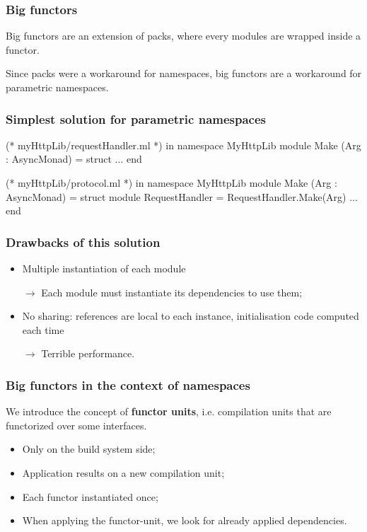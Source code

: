 \documentclass{beamer}
\begin{document}
\begin{frame}
\frametitle{Big functors}

Big functors are an extension of packs, where every modules are wrapped inside a
functor. 

\medskip

Since packs were a workaround for namespaces, big functors are a workaround for
parametric namespaces.

\end{frame}

\begin{frame}[fragile]
  \frametitle{Simplest solution for parametric namespaces}
    \begin{OCaml}
      (* myHttpLib/requestHandler.ml *)
      in namespace MyHttpLib
      module Make (Arg : AsyncMonad) = 
        struct 
          ...
        end
    \end{OCaml}

    \pause 

    \begin{OCaml}
      (* myHttpLib/protocol.ml *)
      in namespace MyHttpLib
      module Make (Arg : AsyncMonad) = 
        struct
          module RequestHandler = RequestHandler.Make(Arg)
          ...
        end
    \end{OCaml}
\end{frame}

\begin{frame}
  \frametitle{Drawbacks of this solution}
  \begin{itemize}[<+->]
    \item Multiple instantiation of each module

      $\rightarrow$ Each module must instantiate its dependencies to use them;
    \item No sharing: references are local to each instance, initialisation code
      computed each time
    
      $\rightarrow$ Terrible performance.
  \end{itemize}
\end{frame}

\begin{frame}
  \frametitle{Big functors in the context of namespaces}

  We introduce the concept of \textbf{functor units}, i.e. compilation units that
  are functorized over some interfaces. 

  \medskip

  \begin{itemize}
    \item Only on the build system side;
    \item Application results on a new compilation unit;
    \item Each functor instantiated \alert{once};
    \item When applying the functor-unit, we look for already applied
      dependencies.
  \end{itemize}

\end{frame}
\end{document}

